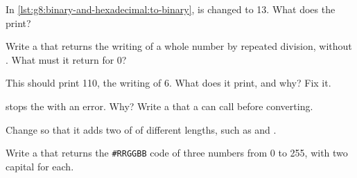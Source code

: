 \begin{exercise}[$\star$]\label{exo:g8:binary-and-hexadecimal:3}
In \cref{lst:g8:binary-and-hexadecimal:to-binary},  is changed to 13.
What does the  print?
\end{exercise}

\begin{exercise}[$\star$]\label{exo:g8:binary-and-hexadecimal:4}
Write a   that returns the  writing of a whole
number by repeated division, without . What must it return for 0?
\end{exercise}

\begin{exercise}[$\star\star$]\label{exo:g8:binary-and-hexadecimal:5}
This  should print 110, the  writing of 6. What does it print,
and why? Fix it.

\label{lst:g8:binary-and-hexadecimal:downwards}
\end{exercise}

\begin{exercise}[$\star\star$]\label{exo:g8:binary-and-hexadecimal:6}
 stops the  with an error. Why? Write a 
 that a  can call before converting.
\end{exercise}

\begin{exercise}[$\star\star$]\label{exo:g8:binary-and-hexadecimal:7}
Change  so that it adds two  of  of different
lengths, such as  and .
\end{exercise}

\begin{exercise}[$\star\star$]\label{exo:g8:binary-and-hexadecimal:8}
Write a   that returns the
\texttt{\#RRGGBB} code of three numbers from 0 to 255, with two capital
 for each.
\end{exercise}

